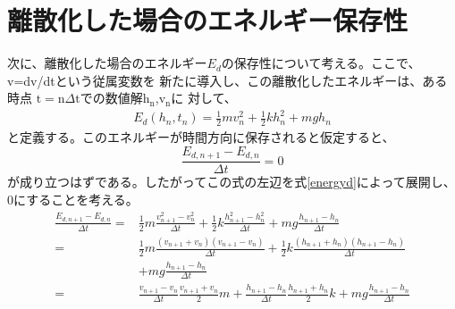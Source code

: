 \documentclass[12pt]{ltjsarticle}
\begin{document}
\section{離散化した場合のエネルギー保存性}
次に、離散化した場合のエネルギー$E_d$の保存性について考える。ここで、v=dv/dtという従属変数を
新たに導入し、この離散化したエネルギーは、ある時点
$\text{t}=\text{n}\Delta\text{t}$での数値解$\text{h}_\text{n}$,$\text{v}_\text{n}$に
対して、
\begin{eqnarray}
    E_d (h_n,t_n) = \frac{1}{2}mv_n^2 + \frac{1}{2}kh_n^2 + mgh_n
    \label{energyd}
\end{eqnarray}
と定義する。このエネルギーが時間方向に保存されると仮定すると、
\begin{equation}
    \frac{E_{d,n+1}-E_{d,n}}{\Delta t} = 0
\end{equation}
が成り立つはずである。したがってこの式の左辺を式\ref{energyd}によって展開し、0にすることを考える。
\begin{equation*}
    \begin{split}
        \frac{E_{d,n+1}-E_{d,n}}{\Delta t} =&　\frac{1}{2}m\frac{v_{n+1}^2 - v_n^2}{\Delta t}
        + \frac{1}{2}k\frac{h_{n+1}^2 - h_n^2}{\Delta t} + mg\frac{h_{n+1}-h_n}{\Delta t} \\
        = &\frac{1}{2}m\frac{(v_{n+1}+v_n)(v_{n+1}-v_n)}{\Delta t}+\frac{1}{2}k\frac{(h_{n+1}+h_n)(h_{n+1}-h_n)}{\Delta t} \\
        &+mg\frac{h_{n+1}-h_n}{\Delta t} \\
        = &\frac{v_{n+1}-v_n}{\Delta t}\frac{v_{n+1}+v_n}{2}m+\frac{h_{n+1}-h_n}{\Delta t}\frac{h_{n+1}+h_n}{2}k
        +mg\frac{h_{n+1}-h_n}{\Delta t}
\end{split}
\end{equation*}
\end{document}
